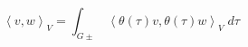 \begin{equation}
\left\langle v,w \right\rangle_V = \int_{G\pm} \,
\left\langle \theta (\tau ) v ,\theta (\tau ) w \right\rangle_V \; 
d \tau
\label{eq:unitarygprod}
\end{equation}

